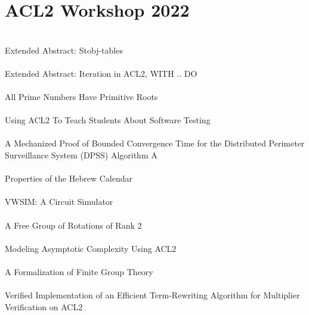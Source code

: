 \documentclass{article}
\begin{document}
\section{ACL2 Workshop 2022}

\cite{22-kaufmann-tables} \\
Extended Abstract: Stobj-tables \\

\cite{22-kaufmann-iteration} \\
Extended Abstract: Iteration in {ACL2}, {WITH} .. {DO} \\

\cite{22-gamboa-prime} \\
All Prime Numbers Have Primitive Roots \\

\cite{22-gamboa-teach} \\
Using {ACL2} To Teach Students About Software Testing \\

\cite{22-greve-dpss} \\
A Mechanized Proof of Bounded Convergence Time for the Distributed Perimeter Surveillance System {(DPSS)} Algorithm {A} \\

\cite{22-russinoff-calendar} \\
Properties of the Hebrew Calendar \\

\cite{22-hunt-vwsim} \\
{VWSIM:} {A} Circuit Simulator \\

\cite{22-bapanapally-rotations} \\
A Free Group of Rotations of Rank 2 \\

\cite{22-young-complexity} \\
Modeling Asymptotic Complexity Using {ACL2} \\

\cite{22-russinoff-groups} \\
A Formalization of Finite Group Theory \\

\cite{22-temel-multipliers} \\
Verified Implementation of an Efficient Term-Rewriting Algorithm for Multiplier Verification on {ACL2} \\
\end{document}
